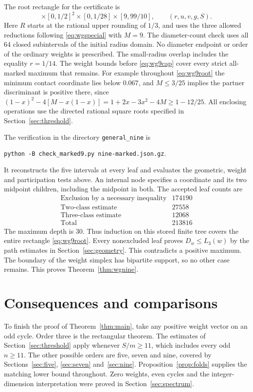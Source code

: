 \documentclass[11pt,a4paper]{article}
\theoremstyle{definition}
\begin{document}
The root rectangle for the certificate is
\begin{equation}
 [1/14,R]\times[0,1/2]^2\times[0,1/28]\times[9,99/10],
 \qquad (r,u,v,g,S).\label{eq:wg9root}
\end{equation}
Here $R$ starts at the rational upper rounding of $1/3$, and uses the
three allowed reductions following \eqref{eq:wgspecial} with $M=9$.
The diameter-count check uses all 64 closed subintervals of the
initial radius domain. No diameter endpoint or order of the ordinary
weights is prescribed. The small-radius overlap includes the equality
$r=1/14$. The weight bounds before \eqref{eq:wg9cap} cover every
strict all-marked maximum that remains. For example throughout
\eqref{eq:wg9root} the minimum contact coordinate lies below $0.067$,
and $M\le3/25$ implies the partner discriminant is positive there, since
$(1-x)^2-4[M-x(1-x)]=1+2x-3x^2-4M\ge 1-12/25$.
All enclosing operations use the directed rational square roots
specified in Section~\ref{sec:threshold}.

The verification in the directory \texttt{general\_nine} is
\begin{center}
\texttt{python -B check\_marked9.py nine-marked.json.gz}.
\end{center}
It reconstructs the five intervals at every leaf and evaluates the
geometric, weight and participation tests above. An internal node
specifies a coordinate and its two midpoint children, including the
midpoint in both. The accepted leaf counts are
\[
 \begin{array}{c|r}
 \text{Exclusion by a necessary inequality}&174190\\
 \text{Two-class estimate}&27558\\
 \text{Three-class estimate}&12068\\ \hline
 \text{Total}&213816
 \end{array}
\]
The maximum depth is $30$. Thus induction on this stored finite
tree covers the entire rectangle \eqref{eq:wg9root}. Every
nonexcluded leaf proves $D_w\le L_3(w)$ by
the path estimates in Section~\ref{sec:geometry}. This
contradicts a positive maximum. The boundary of the weight simplex
has bipartite support, so no other case remains. This proves
Theorem~\ref{thm:wgnine}.

\section{Consequences and comparisons}\label{sec:examples}

To finish the proof of Theorem~\ref{thm:main}, take any positive weight vector on an odd cycle. Order three is the rectangular theorem. The estimates of Section~\ref{sec:threshold} apply whenever \(S/m\ge11\), which includes every odd \(n\ge11\). The other possible orders are five, seven and nine, covered by Sections~\ref{sec:five}, \ref{sec:seven} and~\ref{sec:nine}. Proposition~\ref{prop:folds} supplies the matching lower bound throughout. Zero weights, even cycles and the integer-dimension interpretation were proved in Section~\ref{sec:spectrum}.
\end{document}

